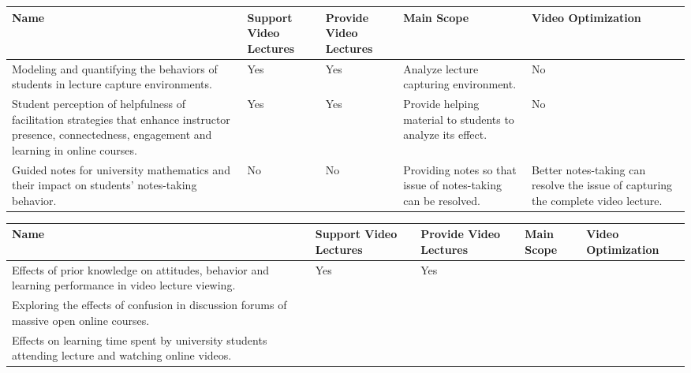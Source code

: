 \begin{sideways}
\centering
\begin{tabularx}{1.5\textwidth} { 
  | >{\raggedright\arraybackslash}X 
  | >{\centering\arraybackslash}X | >{\centering\arraybackslash}X | >{\centering\arraybackslash}X | >{\raggedleft\arraybackslash}X | }
 \hline
\bfseries{Name} & \bfseries{Support Video Lectures} &\bfseries{Provide Video Lectures} &\bfseries{Main Scope} & \bfseries{Video Optimization}  \\
\hline
Modeling and quantifying the behaviors of students in lecture capture environments.\cite{Brooks2014}
& Yes
& Yes
& Analyze lecture capturing environment.
& No
\\
\hline
Student perception of helpfulness of facilitation strategies that enhance instructor presence, connectedness, engagement and learning in online courses.\cite{Martin2018}
& Yes
& Yes
& Provide helping material to students to analyze its effect.
& No
\\
\hline
Guided notes for university mathematics and their impact on students' notes-taking behavior.\cite{Iannone2019}
& No
& No
& Providing notes so that issue of notes-taking can be resolved.
& Better notes-taking can resolve the issue of capturing the complete video lecture.
\\
\hline



\end{tabularx}
\end{sideways}


\begin{sideways}
\centering
\begin{tabularx}{1.5\textwidth} { 
  | >{\raggedright\arraybackslash}X 
  | >{\centering\arraybackslash}X | >{\centering\arraybackslash}X | >{\centering\arraybackslash}X | >{\raggedleft\arraybackslash}X | }
 \hline
\bfseries{Name} & \bfseries{Support Video Lectures} &\bfseries{Provide Video Lectures} &\bfseries{Main Scope} & \bfseries{Video Optimization}  \\
\hline
Effects of prior knowledge on attitudes, behavior and learning performance in video lecture viewing.\cite{Li2019}
& Yes
& Yes
& 
&
\\
\hline
Exploring the effects of confusion in discussion forums of massive open online courses.\cite{Yang2015}
&
&
&
&
\\
\hline
Effects on learning time spent by university students attending lecture and watching online videos.\cite{Meehan2019}
&
&
&
&
\\

\hline

\end{tabularx}
\end{sideways}


